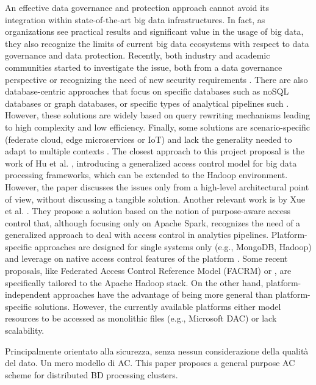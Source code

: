 An effective data governance and protection approach cannot avoid its integration within state-of-the-art big data infrastructures. In fact, as organizations see practical results and significant value in the usage of big data, they also recognize the limits of current big data ecosystems with respect to data governance and data protection. Recently, both industry and academic communities started to investigate the issue, both from a data governance perspective \cite{al2018exploring,aissa2020decide} or recognizing the need of new security requirements \cite{Colombo:JournCybersec:2019}.
There are also database-centric approaches that focus on specific databases such as noSQL databases or graph databases, or specific types of analytical pipelines such \cite{AConGraphDB:2021, AConMongoDB:2022, ABACforHBase:2019}. However, these solutions are widely based on query rewriting mechanisms leading to high complexity and low efficiency. Finally, some solutions are scenario-specific (federate cloud, edge microservices or IoT) and lack the generality needed to adapt to multiple contexts \cite{MultipartyAC:2019, IoTSecurity}. The closest approach to this project proposal is the work of Hu et al. \cite{ HUFerraiolo:2014}, introducing a generalized access control model for big data processing frameworks, which can be extended to the Hadoop environment. However, the paper discusses the issues only from a high-level architectural point of view, without discussing a tangible solution. Another relevant work is by Xue et al. \cite{GuardSpark:ACSAC:2020}. They propose a solution based on the notion of purpose-aware access control \cite{Byun2008} that, although focusing only on Apache Spark, recognizes the need of a generalized approach to deal with access control in analytics pipelines.
Platform-specific approaches are designed for single systems only (e.g., MongoDB, Hadoop) and leverage on native access control features of the platform \cite{rathore2017hadoop,anisetti2018privacy}.
Some recent proposals, like Federated Access Control Reference Model (FACRM) \cite{FederationAC:Journ:2020} or \cite{Sandhu:ABAC:2018,GuptaSandu:2017}, are specifically tailored to the Apache Hadoop stack.
On the other hand, platform-independent approaches have the advantage of being more general than platform-specific solutions. However, the currently available platforms either model resources to be accessed as monolithic files (e.g., Microsoft DAC) or lack scalability.

\cite{7014544} Principalmente orientato alla sicurezza, senza nessun considerazione della qualità del dato. Un mero modello di AC.
This paper proposes a general purpose AC scheme for distributed BD processing clusters.

